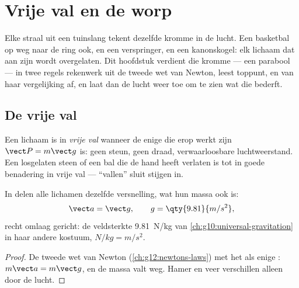 \chapter{Vrije val en de worp}\label{ch:g12:projectile-motion}

Elke straal uit een tuinslang tekent dezelfde kromme in de lucht. Een
basketbal op weg naar de ring ook, en een verspringer, en een kanonskogel:
elk lichaam dat aan zijn  wordt overgelaten. Dit hoofdstuk verdient
die kromme --- een parabool --- in twee regels rekenwerk uit de tweede wet
van Newton, leest toppunt,  en  van haar vergelijking af,
en laat dan de lucht weer toe om te zien wat die bederft.

\section{De vrije val}

\begin{definition}\label{def:g12:projectile-motion:freefall}
Een lichaam is in \emph{vrije val} wanneer de enige 
die erop werkt zijn  $\vect P = m\vect g$ is: geen steun, geen draad,
verwaarloosbare luchtweerstand. Een losgelaten steen of een bal die de hand
heeft verlaten is tot in goede benadering in vrije val --- ``vallen'' sluit
stijgen in.
\end{definition}

\begin{theorem}\label{thm:g12:projectile-motion:galileo}
In  delen alle lichamen dezelfde versnelling, wat hun massa ook is:
\[
\vect a = \vect g, \qquad g = \qty{9.81}{m/s^2},
\]
recht omlaag gericht: de veldsterkte \qty{9.81}{N/kg} van
\cref{ch:g10:universal-gravitation} in haar andere kostuum,
$\unit{N/kg} = \unit{m/s^2}$.
\end{theorem}

\begin{proof}
De tweede wet van Newton (\cref{ch:g12:newtons-laws}) met het  als
enige : $m\vect a = m\vect g$, en de massa valt weg. Hamer en veer
verschillen alleen door de lucht.
\end{proof}

